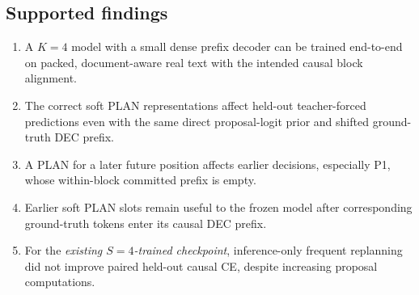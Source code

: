 \documentclass[11pt,letterpaper]{article}
\begin{document}
\subsection{Supported findings}
\begin{enumerate}
\item A $K=4$ model with a small dense prefix decoder can be trained end-to-end on packed, document-aware real text with the intended causal block alignment.
\item The correct soft PLAN representations affect held-out teacher-forced predictions even with the same direct proposal-logit prior and shifted ground-truth DEC prefix.
\item A PLAN for a later future position affects earlier decisions, especially P1, whose within-block committed prefix is empty.
\item Earlier soft PLAN slots remain useful to the frozen model after corresponding ground-truth tokens enter its causal DEC prefix.
\item For the \emph{existing $S=4$-trained checkpoint}, inference-only frequent replanning did not improve paired held-out causal CE, despite increasing proposal computations.
\end{enumerate}
\end{document}
